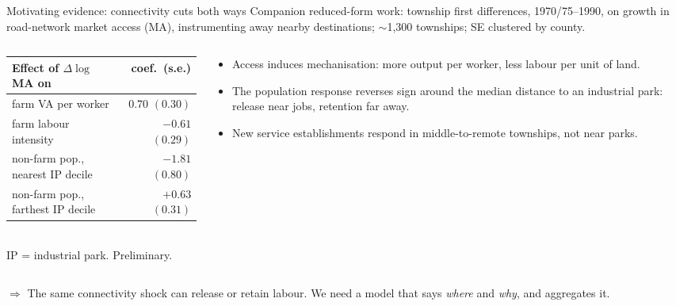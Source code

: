 \documentclass[10pt,aspectratio=169]{beamer}
\newcommand{\hl}[1]{\textcolor{mOrange}{#1}}
\begin{document}
\begin{frame}{Motivating evidence: connectivity cuts both ways}
  \footnotesize
  Companion reduced-form work: township first differences, 1970/75--1990, on growth in
  road-network market access (MA), instrumenting away nearby destinations; $\sim$1,300
  townships; SE clustered by county.
  \vspace{0.4em}
  \begin{columns}[T]
    \begin{column}{0.48\textwidth}
      \footnotesize
      \begin{tabular}{@{}lr@{}}
        \toprule
        Effect of $\Delta\log$ MA on & coef.\ (s.e.) \\
        \midrule
        farm VA per worker & $0.70$ $(0.30)$ \\
        farm labour intensity & $-0.61$ $(0.29)$ \\
        \midrule
        non-farm pop., nearest IP decile & $-1.81$ $(0.80)$ \\
        non-farm pop., farthest IP decile & $+0.63$ $(0.31)$ \\
        \bottomrule
      \end{tabular}\\[0.2em]
      \tiny IP = industrial park. Preliminary.
    \end{column}
    \begin{column}{0.48\textwidth}
      \footnotesize
      \begin{itemize}
        \item Access induces \hl{mechanisation}: more output per worker, less labour per
              unit of land.
        \item The population response \hl{reverses sign} around the median distance to an
              industrial park: release near jobs, retention far away.
        \item New service establishments respond in middle-to-remote townships, not near
              parks.
      \end{itemize}
    \end{column}
  \end{columns}
  \vspace{0.4em}
  \centering\small
  $\Rightarrow$ The same connectivity shock can release or retain labour. We need a model
  that says \emph{where} and \emph{why}, and aggregates it.
\end{frame}

\end{document}
